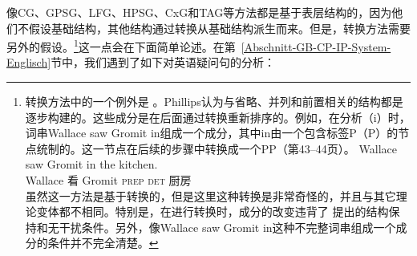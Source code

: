 \noindent
像CG\indexcgc、GPSG\indexgpsgc、LFG\indexlfgc、HPSG\indexhpsgc、CxG\indexcxgc 和TAG\indextagc 等方法都是基于表层结构的，因为他们不假设基础结构，其他结构通过转换从基础结构派生而来。但是，转换方法需要另外的假设。\footnote{%
	转换方法中的一个例外是 。Phillips认为与省略、并列和前置相关的结构都是逐步构建的。这些成分是在后面通过转换重新排序的。例如，在分析（i）时，词串Wallace saw Gromit in组成一个成分，其中in由一个包含标签P（P）的节点统制的。这一节点在后续的步骤中转换成一个PP（第43--44页）。
\ea
\gll Wallace saw Gromit in the kitchen.\\
    Wallace 看 Gromit \textsc{prep} \textsc{det} 厨房\\
\z
虽然这一方法是基于转换的，但是这里这种转换是非常奇怪的，并且与其它理论变体都不相同。特别是，在进行转换时，成分的改变违背了 \citet{Chomsky2008a}提出的结构保持和无干扰条件。另外，像Wallace saw Gromit in这种不完整词串组成一个成分的条件并不完全清楚。%
}这一点会在下面简单论述。在第~\ref{Abschnitt-GB-CP-IP-System-Englisch}节中，我们遇到了如下对英语疑问句的分析：
